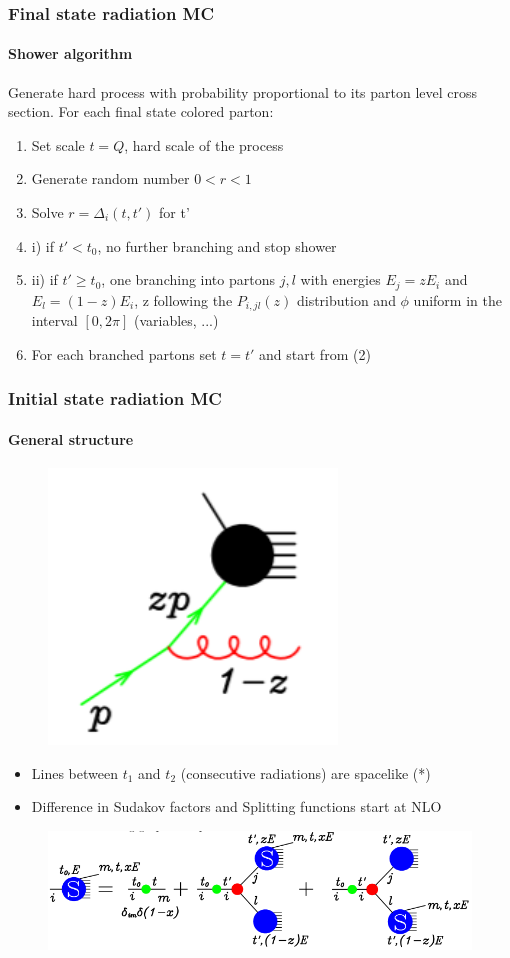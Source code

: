 \documentclass[aspectratio=43]{beamer}
\begin{document}
\begin{frame}

	\frametitle{Final state radiation MC}
	\framesubtitle{Shower algorithm}
	
	Generate hard process with probability proportional to its parton level cross section. For each final state colored parton:
	\begin{enumerate} 
		\item Set scale $t = Q$, hard scale of the process
		\item Generate random number $0 < r < 1$
		\item Solve $r = \Delta_{i}(t, t')$ for t'
		\item i) if $t' < t_{0}$, no further branching and stop shower
		\item ii) if $t' \geq t_{0}$, one branching into partons $j, l$ with energies $E_{j} = zE_{i}$ and $E_{l} = (1 - z)E_{i}$, z following the $P_{i, jl}(z)$ distribution and $\phi$ uniform in the interval $[0, 2\pi]$ (variables, ...)
		\item For each branched partons set $t = t'$ and start from (2)
	\end{enumerate}

\end{frame}

\begin{frame}

	\frametitle{Initial state radiation MC}
	\framesubtitle{General structure}
	
	\begin{figure}
		\includegraphics[width = 3 cm]{plots/shower_ISR_0.png}
	\end{figure}
	
	\begin{itemize} 
		\item Lines between $t_{1}$ and $t_{2}$ (consecutive radiations) are spacelike {\color{blue}(*)}
		\item Difference in Sudakov factors and Splitting functions start at NLO
	\end{itemize}
	
	\begin{figure}
		\includegraphics[width = 10 cm]{plots/shower_ISR_3.png}
	\end{figure}

\end{frame}
\end{document}
